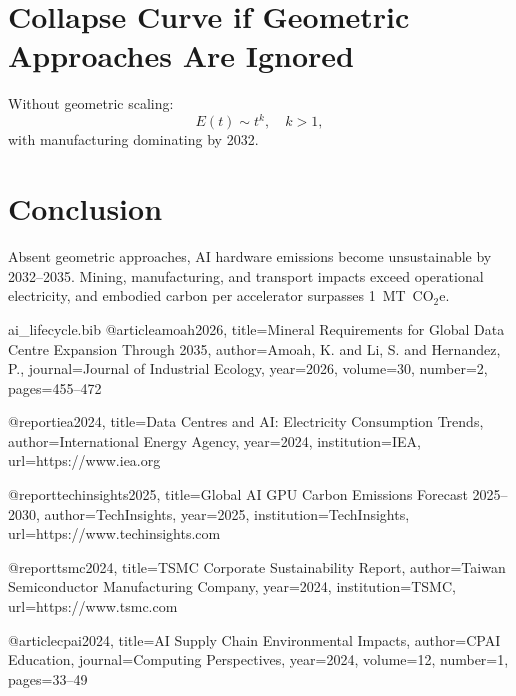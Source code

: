 \documentclass[12pt]{article}
\begin{document}
\section{Collapse Curve if Geometric Approaches Are Ignored}
Without geometric scaling:
\[
E(t) \sim t^k, \quad k > 1,
\]
with manufacturing dominating by 2032.

\section{Conclusion}
Absent geometric approaches, AI hardware emissions become unsustainable by 2032--2035. 
Mining, manufacturing, and transport impacts exceed operational electricity, 
and embodied carbon per accelerator surpasses 1~MT~CO$_2$e.


\begin{filecontents*}{ai_lifecycle.bib}
@article{amoah2026,
  title={Mineral Requirements for Global Data Centre Expansion Through 2035},
  author={Amoah, K. and Li, S. and Hernandez, P.},
  journal={Journal of Industrial Ecology},
  year={2026},
  volume={30},
  number={2},
  pages={455--472}
}

@report{iea2024,
  title={Data Centres and AI: Electricity Consumption Trends},
  author={International Energy Agency},
  year={2024},
  institution={IEA},
  url={https://www.iea.org}
}

@report{techinsights2025,
  title={Global AI GPU Carbon Emissions Forecast 2025--2030},
  author={TechInsights},
  year={2025},
  institution={TechInsights},
  url={https://www.techinsights.com}
}

@report{tsmc2024,
  title={TSMC Corporate Sustainability Report},
  author={Taiwan Semiconductor Manufacturing Company},
  year={2024},
  institution={TSMC},
  url={https://www.tsmc.com}
}

@article{cpai2024,
  title={AI Supply Chain Environmental Impacts},
  author={CPAI Education},
  journal={Computing Perspectives},
  year={2024},
  volume={12},
  number={1},
  pages={33--49}
}
\end{filecontents*}


\printbibliography
\end{document}
